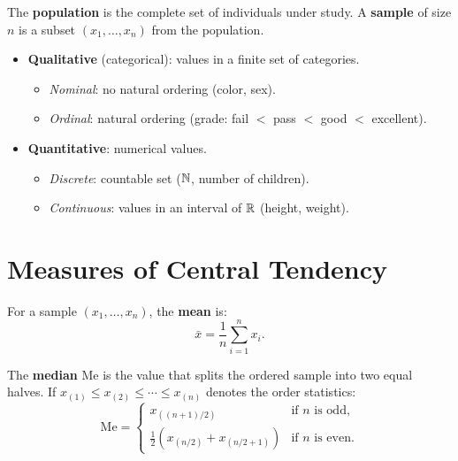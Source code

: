 \begin{definition}
The \textbf{population} is the complete set of individuals under study. A \textbf{sample} of size $n$ is a subset $(x_1,\ldots,x_n)$ from the population.
\end{definition}

\begin{definition}
\begin{itemize}
\item \textbf{Qualitative} (categorical): values in a finite set of categories.
  \begin{itemize}
  \item \emph{Nominal}: no natural ordering (color, sex).
  \item \emph{Ordinal}: natural ordering (grade: fail $<$ pass $<$ good $<$ excellent).
  \end{itemize}
\item \textbf{Quantitative}: numerical values.
  \begin{itemize}
  \item \emph{Discrete}: countable set ($\mathbb{N}$, number of children).
  \item \emph{Continuous}: values in an interval of $\mathbb{R}$ (height, weight).
  \end{itemize}
\end{itemize}
\end{definition}

\section{Measures of Central Tendency}

\begin{definition}
For a sample $(x_1,\ldots,x_n)$, the \textbf{mean} is:
\[
\bar{x} = \frac{1}{n}\sum_{i=1}^{n} x_i.
\]
\end{definition}

\begin{definition}[Median]
The \textbf{median} $\mathrm{Me}$ is the value that splits the ordered sample into two equal halves. If $x_{(1)}\leq x_{(2)}\leq\cdots\leq x_{(n)}$ denotes the order statistics:
\[
\mathrm{Me} = \begin{cases}
x_{((n+1)/2)} & \text{if } n \text{ is odd,}\\
\frac{1}{2}\left(x_{(n/2)}+x_{(n/2+1)}\right) & \text{if } n \text{ is even.}
\end{cases}
\]
\end{definition}


